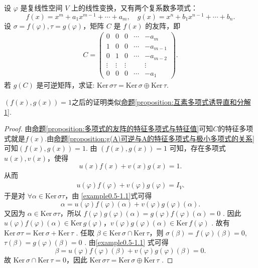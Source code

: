 \documentclass[../../main.tex]{subfiles}%
\begin{document}
\begin{example}
设 $\varphi$ 是复线性空间 $V$ 上的线性变换，又有两个复系数多项式：
\[f(x)=x^m + a_1x^{m - 1}+\cdots + a_m, \quad g(x)=x^n + b_1x^{n - 1}+\cdots + b_n.\]
设 $\sigma = f(\varphi),\tau = g(\varphi)$，矩阵 $C$ 是 $f(x)$ 的友阵，即
\begin{align*}
C = \begin{pmatrix}
0 & 0 & 0 & \cdots & -a_m \\
1 & 0 & 0 & \cdots & -a_{m - 1} \\
0 & 1 & 0 & \cdots & -a_{m - 2} \\
\vdots & \vdots & \vdots & & \vdots \\
0 & 0 & 0 & \cdots & -a_1
\end{pmatrix}.
\end{align*}
若 $g(C)$ 是可逆矩阵，求证: $\mathrm{Ker}\,\sigma \tau =\mathrm{Ker}\,\sigma \oplus \mathrm{Ker}\,\tau $. 
\end{example}
\begin{note}
$(f(x),g(x))=1$之后的证明类似\hyperref[proposition:互素多项式诱导直和分解1]{命题\ref{proposition:互素多项式诱导直和分解1}}.
\end{note}
\begin{proof}
由\hyperref[proposition:多项式的友阵的特征多项式与特征值]{命题\ref{proposition:多项式的友阵的特征多项式与特征值}}可知$C$的特征多项式就是$f(x)$.由\hyperref[proposition:g(A)可逆与A的特征多项式与极小多项式的关系]{命题\ref{proposition:g(A)可逆与A的特征多项式与极小多项式的关系}}可知$(f(x),g(x))=1$.
由 $(f(x),g(x)) = 1$ 可知，存在多项式 $u(x),v(x)$，使得
\[u(x)f(x)+v(x)g(x)=1.\]
从而
\begin{align}
u(\varphi)f(\varphi)+v(\varphi)g(\varphi)=I_V. \label{example0.5-1.1}
\end{align}
于是对 $\forall \alpha\in\mathrm{Ker}\,\sigma\tau$，由 
\eqref{example0.5-1.1}式可得
\[\alpha = u(\varphi)f(\varphi)(\alpha)+v(\varphi)g(\varphi)(\alpha).\]
又因为 $\alpha\in\mathrm{Ker}\,\sigma\tau$，所以 $f(\varphi)g(\varphi)(\alpha)=g(\varphi)f(\varphi)(\alpha)=0$ . 因此 $u(\varphi)f(\varphi)(\alpha)\in\mathrm{Ker}\,g(\varphi)$，$v(\varphi)g(\varphi)(\alpha)\in\mathrm{Ker}\,f(\varphi)$ .
故有 $\mathrm{Ker}\,\sigma\tau=\mathrm{Ker}\,\sigma+\mathrm{Ker}\,\tau$ . 任取 $\beta\in\mathrm{Ker}\,\sigma\cap\mathrm{Ker}\,\tau$，则 $\sigma(\beta)=f(\varphi)(\beta)=0$,$\tau(\beta)=g(\varphi)(\beta)=0$ . 由\eqref{example0.5-1.1} 式可得
\[\beta = u(\varphi)f(\varphi)(\beta)+v(\varphi)g(\varphi)(\beta)=0.\]
故 $\mathrm{Ker}\,\sigma\cap\mathrm{Ker}\,\tau = 0$，因此 $\mathrm{Ker}\,\sigma\tau=\mathrm{Ker}\,\sigma\oplus\mathrm{Ker}\,\tau$ . 
\end{proof}
\end{document}
